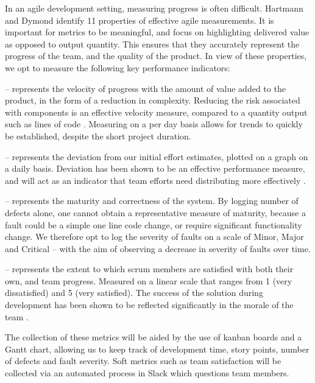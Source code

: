 In an agile development setting, measuring progress is often difficult. Hartmann and Dymond \cite{hartmann2006appropriate} identify 11 properties of effective agile measurements. It is important for metrics to be meaningful, and focus on highlighting delivered value as opposed to output quantity. This ensures that they accurately represent the progress of the team, and the quality of the product. In view of these properties, we opt to measure the following key performance indicators:

\begin{description}[noitemsep,topsep=0pt]
	\item [Story Points Completed per Day] -- represents the velocity of progress with the amount of value added to the product, in the form of a reduction in complexity. Reducing the risk associated with components is an effective velocity measure, compared to a quantity output such as lines of code \cite{davis2015agile}. Measuring on a per day basis allows for trends to quickly be established, despite the short project duration.

	\item [Estimated vs. Actual Time] -- represents the deviation from our initial effort estimates, plotted on a graph on a daily basis. Deviation has been shown to be an effective performance measure, and will act as an indicator that team efforts need distributing more effectively \cite{greening2015agile}.
	\item [Number and Severity of Faults per Day] -- represents the maturity and correctness of the system. By logging number of defects alone, one cannot obtain a representative measure of maturity, because a fault could be a simple one line code change, or require significant functionality change. We therefore opt to log the severity of faults on a scale of Minor, Major and Critical -- with the aim of observing a decrease in severity of faults over time.
	\item [Team Satisfaction] -- represents the extent to which scrum members are satisfied with both their own, and team progress. Measured on a linear scale that ranges from 1 (very dissatisfied) and 5 (very satisfied). The success of the solution during development has been shown to be reflected significantly in the morale of the team \cite{prowarenessagile}.
\end{description}

The collection of these metrics will be aided by the use of kanban boards and a Gantt chart, allowing us to keep track of development time, story points, number of defects and fault severity. Soft metrics such as team satisfaction will be collected via an automated process in Slack which questions team members.
